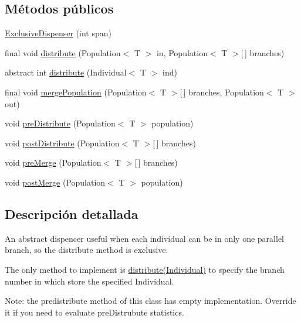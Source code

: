 \subsection*{Métodos públicos}
\begin{DoxyCompactItemize}
\item 
\hyperlink{classjenes_1_1stage_1_1_exclusive_dispenser_3_01_t_01extends_01_chromosome_01_4_af8fba035b8567ce8d509fbc7601b4c75}{Exclusive\-Dispenser} (int span)
\item 
final void \hyperlink{classjenes_1_1stage_1_1_exclusive_dispenser_3_01_t_01extends_01_chromosome_01_4_a7ecda0fa0e34e3a31ab2d06cd2b6d593}{distribute} (Population$<$ T $>$ in, Population$<$ T $>$\mbox{[}$\,$\mbox{]} branches)
\item 
abstract int \hyperlink{classjenes_1_1stage_1_1_exclusive_dispenser_3_01_t_01extends_01_chromosome_01_4_a706558b075a61b04099decf44729c870}{distribute} (Individual$<$ T $>$ ind)
\item 
final void \hyperlink{classjenes_1_1stage_1_1_exclusive_dispenser_3_01_t_01extends_01_chromosome_01_4_a1179e92bbe9a4942b9097d9846c01801}{merge\-Population} (Population$<$ T $>$\mbox{[}$\,$\mbox{]} branches, Population$<$ T $>$ out)
\item 
void \hyperlink{classjenes_1_1stage_1_1_exclusive_dispenser_3_01_t_01extends_01_chromosome_01_4_ad5db6c2748cabd6055a33421f601dba4}{pre\-Distribute} (Population$<$ T $>$ population)
\item 
void \hyperlink{classjenes_1_1stage_1_1_exclusive_dispenser_3_01_t_01extends_01_chromosome_01_4_a70031ab873b045876e716d0e702d7846}{post\-Distribute} (Population$<$ T $>$\mbox{[}$\,$\mbox{]} branches)
\item 
void \hyperlink{classjenes_1_1stage_1_1_exclusive_dispenser_3_01_t_01extends_01_chromosome_01_4_ae93239ca47669daaeea41d2f8ab6fe51}{pre\-Merge} (Population$<$ T $>$\mbox{[}$\,$\mbox{]} branches)
\item 
void \hyperlink{classjenes_1_1stage_1_1_exclusive_dispenser_3_01_t_01extends_01_chromosome_01_4_a67b4ecbb23bc9860e1985a2a573b8823}{post\-Merge} (Population$<$ T $>$ population)
\end{DoxyCompactItemize}


\subsection{Descripción detallada}
An abstract dispencer useful when each individual can be in only one parallel branch, so the distribute method is exclusive.\par
 The only method to implement is \hyperlink{}{distribute(\-Individual)} to specify the branch number in which store the specified Individual.\par
 \par
 Note\-: the predistribute method of this class has empty implementation. Override it if you need to evaluate pre\-Distrubute statistics.



